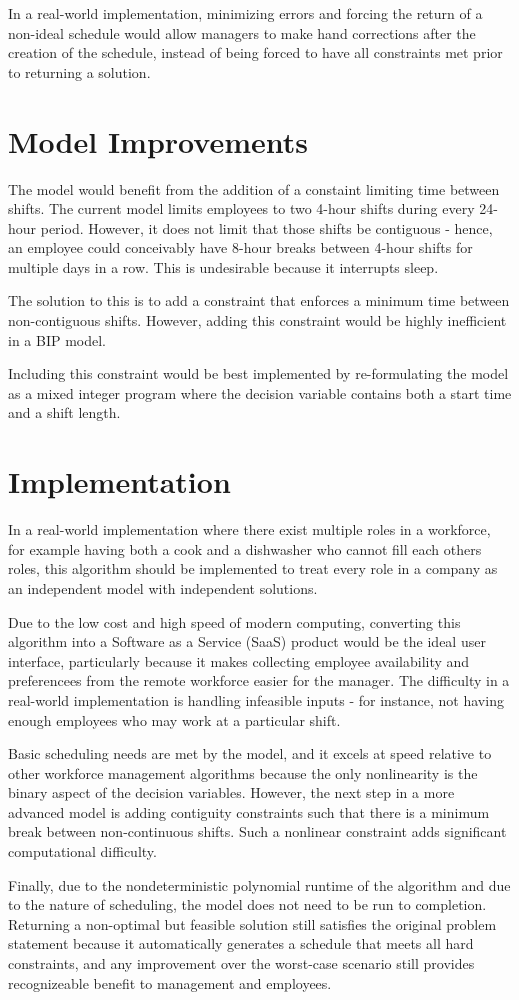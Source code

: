 In a real-world implementation, minimizing errors and forcing the return of a non-ideal schedule would allow managers to make hand corrections after the creation of the schedule, instead of being forced to have all constraints met prior to returning a solution. 

\section{Model Improvements}

The model would benefit from the addition of a constaint limiting time between shifts. The current model limits employees to two 4-hour shifts during every 24-hour period. However, it does not limit that those shifts be contiguous - hence, an employee could conceivably have 8-hour breaks between 4-hour shifts for multiple days in a row. This is undesirable because it interrupts sleep.

The solution to this is to add a constraint that enforces a minimum time between non-contiguous shifts. However, adding this constraint would be highly inefficient in a BIP model. 

Including this constraint would be best implemented by re-formulating the model as a mixed integer program where the decision variable contains both a start time and a shift length. 

\section{Implementation}

In a real-world implementation where there exist multiple roles in a workforce, for example having both a cook and a dishwasher who cannot fill each others roles, this algorithm should be implemented to treat every role in a company as an independent model with independent solutions. 

Due to the low cost and high speed of modern computing, converting this algorithm into a Software as a Service (SaaS) product would be the ideal user interface, particularly because it makes collecting employee availability and preferencees from the remote workforce easier for the manager.  The difficulty in a real-world implementation is handling infeasible inputs - for instance, not having enough employees who may work at a particular shift.

Basic scheduling needs are met by the model, and it excels at speed relative to other workforce management algorithms because the only nonlinearity is the binary aspect of the decision variables. However, the next step in a more advanced model is adding contiguity constraints such that there is a minimum break between non-continuous shifts. Such a nonlinear constraint adds significant computational difficulty.

Finally, due to the nondeterministic polynomial runtime of the algorithm and due to the nature of scheduling, the model does not need to be run to completion. Returning a non-optimal but feasible solution still satisfies the original problem statement because it automatically generates a schedule that meets all hard constraints, and any improvement over the worst-case scenario still provides recognizeable benefit to management and employees.


